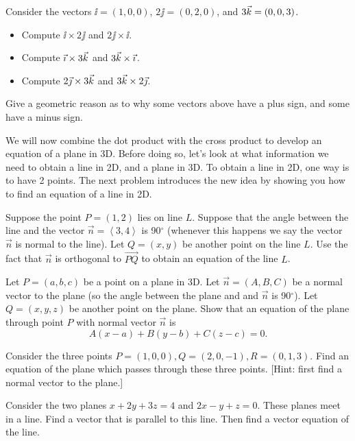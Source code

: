 \begin{problem} 
Consider the vectors ${\ii}=(1,0,0)$, ${2\jj}=(0,2,0)$, and ${3\vec k}=(0,0,3)$.
\begin{itemize}
\item Compute $\ii\times {2\jj}$ and ${2\jj}\times {\ii}$.
\item Compute ${\vec \imath}\times {3\ensuremath{\vec k}}$ and ${3\vec k}\times {\ensuremath{\vec \imath}}$.
\item Compute ${2\vec \jmath}\times {3\ensuremath{\vec k}}$ and ${3\vec k}\times {2\ensuremath{\vec \jmath}}$.
\end{itemize}
Give a geometric reason as to why some vectors above have a plus sign, and some have a minus sign.
\end{problem}

We will now combine the dot product with the cross product to develop an equation of a plane in 3D. 
Before doing so, let's look at what information we need to obtain a line in 2D, and a plane in 3D.  
To obtain a line in 2D, one way is to have 2 points. 
The next problem introduces the new idea by showing you how to find an equation of a line in 2D. 

\begin{problem}
Suppose the point $P=(1,2)$ lies on line $L$. Suppose that the angle between the line and the vector $\vec n=\left<3,4\right>$ is 90$^\circ$ (whenever this happens we say the vector $\vec n$ is normal to the line). Let $Q=(x,y)$ be another point on the line $L$. Use the fact that $\vec n$ is orthogonal to $\vec {PQ}$ to obtain an equation of the line $L$. 
\end{problem}

\begin{problem}
Let $P=(a,b,c)$ be a point on a plane in 3D. Let $\vec n=(A,B,C)$ be a normal vector to the plane (so the angle between the plane and and $\vec n$ is 90$^\circ$).  Let $Q=(x,y,z)$ be another point on the plane.  Show that an equation of the plane through point $P$ with normal vector $\vec n$ is $$A(x-a)+B(y-b)+C(z-c)=0.$$
\end{problem}

\begin{problem}  
Consider the three points $P=(1,0,0), Q=(2,0,-1), R=(0,1,3)$. Find an equation of the plane which passes through these three points.  [Hint: first find a normal vector to the plane.]
\end{problem}

\begin{problem}  
Consider the two planes $x+2y+3z=4$ and $2x-y+z=0$.  These planes meet in a line.  Find a vector that is parallel to this line.  Then find a vector equation of the line.
\end{problem}

